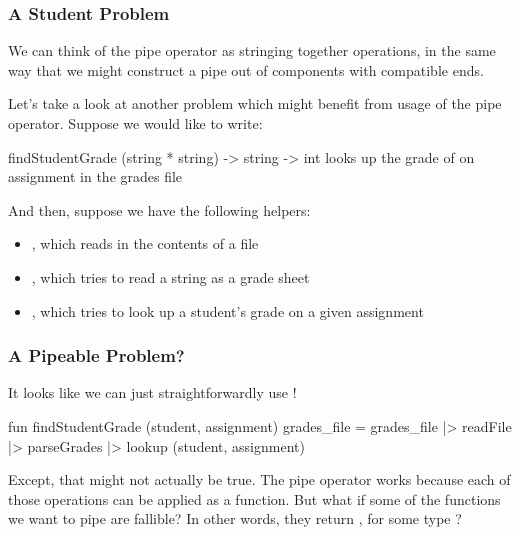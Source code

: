 \documentclass[aspectratio=169]{beamer}
\begin{document}
\begin{frame}[fragile]
  \frametitle{A Student Problem}

  We can think of the pipe operator as stringing together operations, in the same way
  that we might construct a pipe out of components with compatible ends.

  \pause
  \vspace{\fill}

  Let's take a look at another problem which might benefit from usage of the 
  pipe operator. Suppose we would like to write: 

  \pause
  \vspace{\fill}

  \spec 
    {findStudentGrade}
    {(string * string) -> string -> int}
    {}
    { looks up the grade of 
    on assignment  in the grades file }

  \pause
  \vspace{\fill}

  And then, suppose we have the following helpers: 
  \begin{itemize} 
    \item {}, which reads in the contents of a file
    \item {}, which tries to read a string as a grade sheet 
    \item {}, which tries to look up a student's
    grade on a given assignment 
  \end{itemize}
\end{frame}

\begin{frame}[fragile]
  \frametitle{A Pipeable Problem?}

  It looks like we can just straightforwardly use \code{|>}!

  \pause
  \vspace{\fill}

  \begin{codeblock}
    fun findStudentGrade (student, assignment) grades_file =
      grades_file
      |> readFile
      |> parseGrades 
      |> lookup (student, assignment)
  \end{codeblock}

  \pause
  \vspace{\fill}

  Except, that might not actually be true. The pipe operator works because each 
  of those operations can be applied as a function. But what if some of the 
  functions we want to pipe are fallible? In other words, they return 
  , for some type ?
\end{frame}
\end{document}
